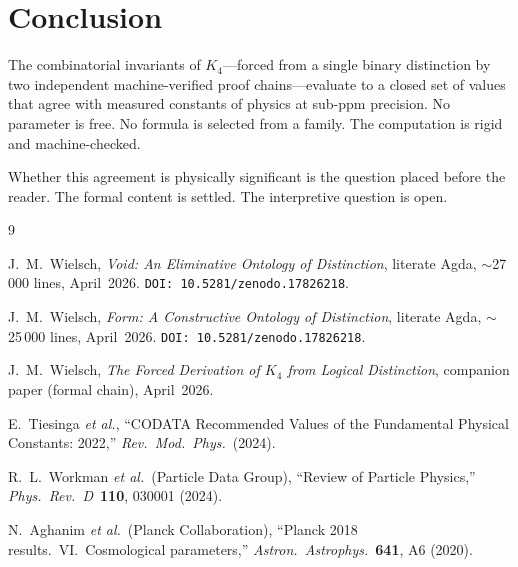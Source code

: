 \documentclass[11pt,a4paper]{article}
\theoremstyle{definition}
\begin{document}
\section{Conclusion}
\label{sec:conclusion}

The combinatorial invariants of $K_4$---forced from a single binary distinction
by two independent machine-verified proof chains---evaluate to a closed set
of values that agree with measured constants of physics at sub-ppm precision.
No parameter is free.  No formula is selected from a family.  The computation
is rigid and machine-checked.

Whether this agreement is physically significant is the question placed before
the reader.  The formal content is settled.  The interpretive question is open.

\begin{thebibliography}{9}

J.~M.~Wielsch,
\textit{Void: An Eliminative Ontology of Distinction},
literate Agda, $\sim$27\,000 lines, April~2026.
\texttt{DOI:~10.5281/zenodo.17826218}.

J.~M.~Wielsch,
\textit{Form: A Constructive Ontology of Distinction},
literate Agda, $\sim$25\,000 lines, April~2026.
\texttt{DOI:~10.5281/zenodo.17826218}.

J.~M.~Wielsch,
\textit{The Forced Derivation of $K_4$ from Logical Distinction},
companion paper (formal chain), April~2026.

E.~Tiesinga \textit{et al.},
``CODATA Recommended Values of the Fundamental Physical Constants: 2022,''
\textit{Rev.~Mod.~Phys.}\ (2024).

R.~L.~Workman \textit{et al.}\ (Particle Data Group),
``Review of Particle Physics,''
\textit{Phys.~Rev.~D}~\textbf{110}, 030001 (2024).

N.~Aghanim \textit{et al.}\ (Planck Collaboration),
``Planck 2018 results.~VI.~Cosmological parameters,''
\textit{Astron.\ Astrophys.}~\textbf{641}, A6 (2020).

\end{thebibliography}
\end{document}
